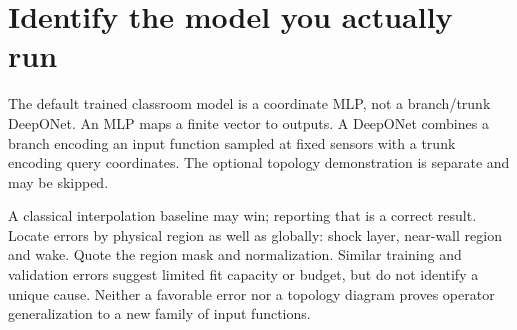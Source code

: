 \section*{Identify the model you actually run}
The default trained classroom model is a coordinate MLP, not a branch/trunk
DeepONet. An MLP maps a finite vector to outputs. A DeepONet combines a branch
encoding an input function sampled at fixed sensors with a trunk encoding query
coordinates. The optional topology demonstration is separate and may be skipped.

A classical interpolation baseline may win; reporting that is a correct result.
Locate errors by physical region as well as globally: shock layer, near-wall
region and wake. Quote the region mask and normalization. Similar training and
validation errors suggest limited fit capacity or budget, but do not identify a
unique cause. Neither a favorable error nor a topology diagram proves operator
generalization to a new family of input functions.
